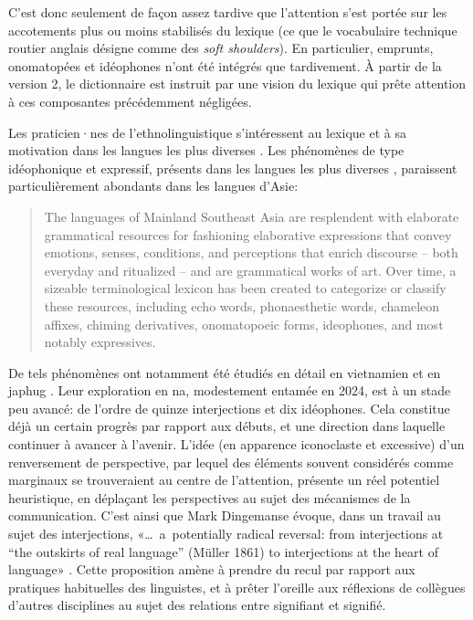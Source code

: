 C'est donc seulement de façon assez tardive que l'attention s'est portée sur les accotements plus ou moins stabilisés du lexique (ce que le vocabulaire technique routier anglais désigne comme des \emph{soft shoulders}). En particulier, emprunts, onomatopées et idéophones n'ont été intégrés que tardivement. À partir de la version 2, le dictionnaire est instruit par une vision du lexique qui prête attention à ces composantes précédemment négligées.

Les praticien·nes de l'ethnolinguistique s'intéressent au lexique et à sa motivation dans les langues les plus diverses \parencite{deColombel2002lexique}. Les phénomènes de type idéophonique et expressif, présents dans les langues les plus diverses \parencite{marsault2024_ideophones}, paraissent particulièrement abondants dans les langues d'Asie:

\begin{quotation}
    The languages of Mainland Southeast Asia are resplendent with elaborate grammatical resources for fashioning elaborative expressions that convey emotions, senses, conditions, and perceptions that enrich discourse -- both everyday and ritualized -- and are grammatical works of art. Over time, a sizeable terminological lexicon has been created to categorize or classify these resources, including echo words, phonaesthetic words, chameleon affixes, chiming derivatives, onomatopoeic forms, ideophones, and most notably expressives. \parencite[1]{williams_aesthetics_2014}
\end{quotation}

De tels phénomènes ont notamment été étudiés en détail en vietnamien \parencite{brunelleetal2014,Pham_Alves_Vietnamese_2024} et en japhug \parencite{jacques2013c}. Leur exploration en na, modestement entamée en 2024, est à un stade peu avancé: de l'ordre de quinze interjections et dix idéophones. Cela constitue déjà un certain progrès par rapport aux débuts, et une direction dans laquelle continuer à avancer à l'avenir. L'idée (en apparence iconoclaste et excessive) d'un renversement de perspective, par lequel des éléments souvent considérés comme marginaux se trouveraient au centre de l'attention, présente un réel potentiel heuristique, en déplaçant les perspectives au sujet des mécanismes de la communication. C'est ainsi que Mark Dingemanse évoque, dans un travail au sujet des interjections, «{\dots}~a~potentially
radical reversal: from interjections at “the outskirts of real language” (Müller 1861) to interjections at the heart of language» \parencite[258]{dingemanse_interjections_2024}. Cette proposition amène à prendre du recul par rapport aux pratiques habituelles des linguistes, et à prêter l'oreille aux réflexions de collègues d'autres disciplines au sujet des relations entre signifiant et signifié.

